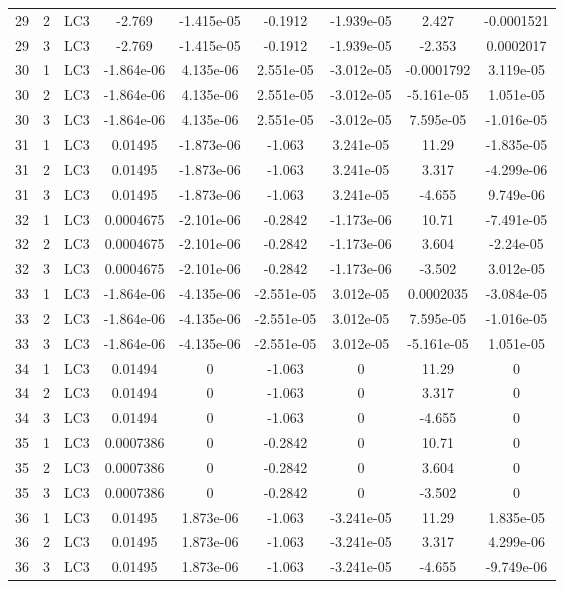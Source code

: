 \documentclass{article}%
\begin{document}
\begin{longtable}{| c c c | c c c c c c |}
29&2&LC3&{-}2.769&{-}1.415e{-}05&{-}0.1912&{-}1.939e{-}05&2.427&{-}0.0001521\\%
29&3&LC3&{-}2.769&{-}1.415e{-}05&{-}0.1912&{-}1.939e{-}05&{-}2.353&0.0002017\\%
30&1&LC3&{-}1.864e{-}06&4.135e{-}06&2.551e{-}05&{-}3.012e{-}05&{-}0.0001792&3.119e{-}05\\%
30&2&LC3&{-}1.864e{-}06&4.135e{-}06&2.551e{-}05&{-}3.012e{-}05&{-}5.161e{-}05&1.051e{-}05\\%
30&3&LC3&{-}1.864e{-}06&4.135e{-}06&2.551e{-}05&{-}3.012e{-}05&7.595e{-}05&{-}1.016e{-}05\\%
31&1&LC3&0.01495&{-}1.873e{-}06&{-}1.063&3.241e{-}05&11.29&{-}1.835e{-}05\\%
31&2&LC3&0.01495&{-}1.873e{-}06&{-}1.063&3.241e{-}05&3.317&{-}4.299e{-}06\\%
31&3&LC3&0.01495&{-}1.873e{-}06&{-}1.063&3.241e{-}05&{-}4.655&9.749e{-}06\\%
32&1&LC3&0.0004675&{-}2.101e{-}06&{-}0.2842&{-}1.173e{-}06&10.71&{-}7.491e{-}05\\%
32&2&LC3&0.0004675&{-}2.101e{-}06&{-}0.2842&{-}1.173e{-}06&3.604&{-}2.24e{-}05\\%
32&3&LC3&0.0004675&{-}2.101e{-}06&{-}0.2842&{-}1.173e{-}06&{-}3.502&3.012e{-}05\\%
33&1&LC3&{-}1.864e{-}06&{-}4.135e{-}06&{-}2.551e{-}05&3.012e{-}05&0.0002035&{-}3.084e{-}05\\%
33&2&LC3&{-}1.864e{-}06&{-}4.135e{-}06&{-}2.551e{-}05&3.012e{-}05&7.595e{-}05&{-}1.016e{-}05\\%
33&3&LC3&{-}1.864e{-}06&{-}4.135e{-}06&{-}2.551e{-}05&3.012e{-}05&{-}5.161e{-}05&1.051e{-}05\\%
34&1&LC3&0.01494&0&{-}1.063&0&11.29&0\\%
34&2&LC3&0.01494&0&{-}1.063&0&3.317&0\\%
34&3&LC3&0.01494&0&{-}1.063&0&{-}4.655&0\\%
35&1&LC3&0.0007386&0&{-}0.2842&0&10.71&0\\%
35&2&LC3&0.0007386&0&{-}0.2842&0&3.604&0\\%
35&3&LC3&0.0007386&0&{-}0.2842&0&{-}3.502&0\\%
36&1&LC3&0.01495&1.873e{-}06&{-}1.063&{-}3.241e{-}05&11.29&1.835e{-}05\\%
36&2&LC3&0.01495&1.873e{-}06&{-}1.063&{-}3.241e{-}05&3.317&4.299e{-}06\\%
36&3&LC3&0.01495&1.873e{-}06&{-}1.063&{-}3.241e{-}05&{-}4.655&{-}9.749e{-}06\\%

\end{longtable}
\end{document}
